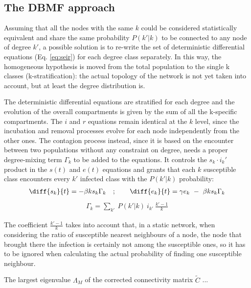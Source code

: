 \documentclass[DIV=12, BCOR=0pt]{scrartcl}  %
\begin{document}
  \subsection{The DBMF approach} 
  Assuming that all the nodes with the same $k$ could be considered statistically equivalent and share the same probability $P(k'|k)$ to be connected to any node of degree $k'$, a possible solution is to re-write the set of deterministic differential equations (Eq. \ref{eq:seir}) for each degree class separately.
  In this way, the homogeneous hypothesis is moved from the total population to the single k classes (k-stratification): the actual topology of the network is not yet taken into account, but at least the degree distribution is. 
  
  The deterministic differential equations are stratified for each degree and the evolution of the overall compartments is given by the sum of all the k-specific compartments. The $i$ and $r$ equations remain identical at the $k$ level, since the incubation and removal processes evolve for each node independently from the other ones. The contagion process instead, since it is based on the encounter between two populations without any constraint on degree, needs a proper degree-mixing term $\Gamma_k$ to be added to the equations. It controls the $s_k \cdot i_k'$ product in the $s(t)$ and $e(t)$ equations and grants that each $k$ susceptible class encounters every $k'$ infected class with the $P(k'|k)$ probability:
  \begin{align}
  	\diff{s_{k}}{t} = - \beta k s_{k} \Gamma_{k} \quad;  \qquad 	\diff{e_{k}}{t} =  \gamma e_{k} \ - \ \beta k s_{k} \Gamma_{k} 
  	\label{eq:seir_dbmf}
  \end{align}
  \begin{align}
  	\Gamma_{k} = \sum_{k'} \ P(k'|k) \ i_{k'}  \ \frac{k' - 1}{k}
  	\label{eq:mixing}
  \end{align}
  
  The coefficient $\frac{k' - 1}{k}$ takes into account that, in a static network, when considering the ratio of susceptible nearest neighbours of a node, the node that brought there the infection is certainly not among the susceptible ones, so it has to be ignored when calculating the actual probability of finding one susceptible neighbour.
  
  The largest eigenvalue $\Lambda_M$ of the corrected connectivity matrix $\tilde{C}$ ... %
 
\end{document}
